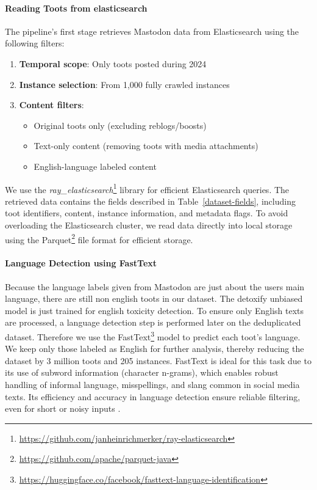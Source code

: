 \paragraph{Reading Toots from elasticsearch}\label{step:reading}
The pipeline's first stage retrieves Mastodon data from Elasticsearch using the following filters:

\begin{enumerate}
    \item \textbf{Temporal scope}: Only toots posted during 2024
    \item \textbf{Instance selection}: From 1,000 fully crawled instances
    \item \textbf{Content filters}:
    \begin{itemize}
        \item Original toots only (excluding reblogs/boosts)
        \item Text-only content (removing toots with media attachments)
        \item English-language labeled content
    \end{itemize}
\end{enumerate}

We use the \textit{ray\_elasticsearch}\footnote{\url{https://github.com/janheinrichmerker/ray-elasticsearch}} library for efficient Elasticsearch queries. The retrieved data contains the fields described in Table~\ref{dataset-fields}, including toot identifiers, content, instance information, and metadata flags. To avoid overloading the Elasticsearch cluster, we read data directly into local storage using the Parquet\footnote{\url{https://github.com/apache/parquet-java}} file format for efficient storage.

\paragraph{Language Detection using FastText}
Because the language labels given from Mastodon are just about the users main language, there are still non english toots in our dataset. The detoxify unbiased model is just trained for english toxicity detection. To ensure only English texts are processed, a language detection step is performed later on the deduplicated dataset. Therefore we use the FastText\footnote{\url{https://huggingface.co/facebook/fasttext-language-identification}} model to predict each toot’s language. We keep only those labeled as English for further analysis, thereby reducing the dataset by 3 million toots and 205 instances.
FastText is ideal for this task due to its use of subword information (character n-grams), which enables robust handling of informal language, misspellings, and slang common in social media texts. Its efficiency and accuracy in language detection ensure reliable filtering, even for short or noisy inputs \cite{joulin:2016}.

